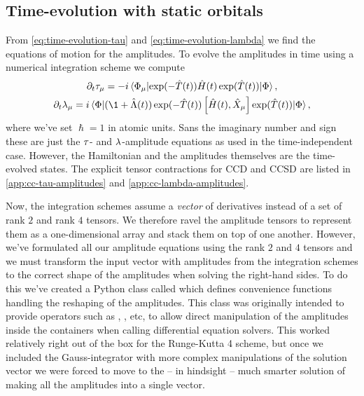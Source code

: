         \subsection{Time-evolution with static orbitals}
            \label{subsec:tdcc-implementation}
            From \autoref{eq:time-evolution-tau} and
            \autoref{eq:time-evolution-lambda} we find the equations of motion
            for the amplitudes.
            To evolve the amplitudes in time using a numerical integration
            scheme we compute
            \begin{gather}
                \partial_t \clustamp_{\mu}
                = -i\mel*{\slat_{\mu}}{
                    \exponential(-\clust(t))
                    \hamil(t)
                    \exponential(\clust(t))
                }{\slat},
                \\
                \partial_t \clustlamp_{\mu}
                = i\mel*{\slat}{
                    (\1 + \clustl(t))
                    \exponential(-\clust(t))
                    \com{\hamil(t)}{\hat{X}_{\mu}}
                    \exponential(\clust(t))
                }{\slat},
            \end{gather}
            where we've set $\hslash = 1$ in atomic units.
            Sans the imaginary number and sign these are just the $\tau$-
            and $\lambda$-amplitude equations as used in the time-independent
            case.
            However, the Hamiltonian and the amplitudes themselves are the
            time-evolved states.
            The explicit tensor contractions for CCD and CCSD are listed in
            \autoref{app:cc-tau-amplitudes} and
            \autoref{app:cc-lambda-amplitudes}.

            Now, the integration schemes assume a \emph{vector} of derivatives
            instead of a set of rank $2$ and rank $4$ tensors.
            We therefore ravel the amplitude tensors to represent them as a
            one-dimensional array and stack them on top of one another.
            However, we've formulated all our amplitude equations using the rank
            $2$ and $4$ tensors and we must transform the input vector with
            amplitudes from the integration schemes to the correct shape of the
            amplitudes when solving the right-hand sides.
            To do this we've created a Python class called
             which defines convenience functions
            handling the reshaping of the amplitudes.
            This class was originally intended to provide operators such as
            , , etc, to allow direct manipulation of
            the amplitudes inside the containers when calling differential
            equation solvers.
            This worked relatively right out of the box for the Runge-Kutta 4
            scheme, but once we included the Gauss-integrator with more complex
            manipulations of the solution vector we were forced to move to the
            -- in hindsight -- much smarter solution of making all the
            amplitudes into a single vector.


